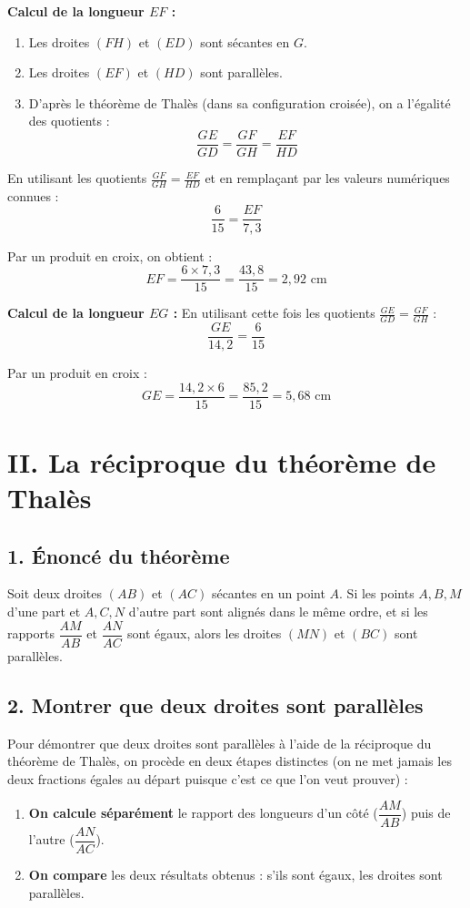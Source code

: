 \documentclass[12pt,a4paper]{article}
\begin{document}
\textbf{Calcul de la longueur $EF$ :}
\begin{enumerate}
    \item Les droites $(FH)$ et $(ED)$ sont sécantes en $G$.
    \item Les droites $(EF)$ et $(HD)$ sont parallèles.
    \item D'après le théorème de Thalès (dans sa configuration croisée), on a l'égalité des quotients :
    $$\frac{GE}{GD} = \frac{GF}{GH} = \frac{EF}{HD}$$
\end{enumerate}

En utilisant les quotients $\frac{GF}{GH} = \frac{EF}{HD}$ et en remplaçant par les valeurs numériques connues :
$$\frac{6}{15} = \frac{EF}{7{,}3}$$

Par un produit en croix, on obtient :
$$EF = \frac{6 \times 7{,}3}{15} = \frac{43{,}8}{15} = 2{,}92\text{ cm}$$

\vspace{0.3cm}
\textbf{Calcul de la longueur $EG$ :}
En utilisant cette fois les quotients $\frac{GE}{GD} = \frac{GF}{GH}$ :
$$\frac{GE}{14{,}2} = \frac{6}{15}$$

Par un produit en croix :
$$GE = \frac{14{,}2 \times 6}{15} = \frac{85{,}2}{15} = 5{,}68\text{ cm}$$
\section*{\color{myred}II. La réciproque du théorème de Thalès}

\subsection*{\color{myred}1. Énoncé du théorème}
Soit deux droites $(AB)$ et $(AC)$ sécantes en un point $A$. 
Si les points $A, B, M$ d'une part et $A, C, N$ d'autre part sont alignés dans le même ordre, et si les rapports $\dfrac{AM}{AB}$ et $\dfrac{AN}{AC}$ sont égaux, alors les droites $(MN)$ et $(BC)$ sont parallèles.

\subsection*{\color{myred}2. Montrer que deux droites sont parallèles}
Pour démontrer que deux droites sont parallèles à l'aide de la réciproque du théorème de Thalès, on procède en deux étapes distinctes (on ne met jamais les deux fractions égales au départ puisque c'est ce que l'on veut prouver) :

\begin{enumerate}
    \item \textbf{On calcule séparément} le rapport des longueurs d'un côté ($\dfrac{AM}{AB}$) puis de l'autre ($\dfrac{AN}{AC}$).
    \item \textbf{On compare} les deux résultats obtenus : s'ils sont égaux, les droites sont parallèles.
\end{enumerate}
\end{document}
